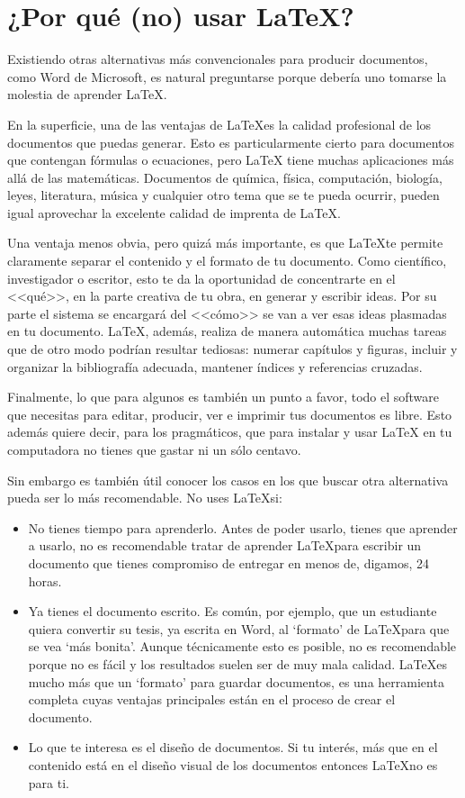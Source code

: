 \documentclass[10pt,a4paper,final,oneside,onecolumn,notitlepage]{article}
\begin{document}
\section{¿Por qu\'e (no) usar \LaTeX?}{
Existiendo otras alternativas más convencionales para producir documentos, como Word de Microsoft, es natural preguntarse porque debería uno tomarse la molestia de aprender LaTeX.

En la superficie, una de las ventajas de \LaTeX es la calidad profesional de los documentos que puedas generar. Esto es particularmente cierto para documentos que contengan fórmulas o ecuaciones, pero LaTeX tiene muchas aplicaciones más allá de las matemáticas. Documentos de química, física, computación, biología, leyes, literatura, música y cualquier otro tema que se te pueda ocurrir, pueden igual aprovechar la excelente calidad de imprenta de LaTeX.

Una ventaja menos obvia, pero quizá más importante, es que \LaTeX te permite claramente separar el contenido y el formato de tu documento. Como científico, investigador o escritor, esto te da la oportunidad de concentrarte en el <<qué>>, en la parte creativa de tu obra, en generar y escribir ideas. Por su parte el sistema se encargará del <<cómo>> se van a ver esas ideas plasmadas en tu documento. LaTeX, además, realiza de manera automática muchas tareas que de otro modo podrían resultar tediosas: numerar capítulos y figuras, incluir y organizar la bibliografía adecuada, mantener índices y referencias cruzadas.

Finalmente, lo que para algunos es también un punto a favor, todo el software que necesitas para editar, producir, ver e imprimir tus documentos es libre. Esto además quiere decir, para los pragmáticos, que para instalar y usar LaTeX en tu computadora no tienes que gastar ni un sólo centavo.

Sin embargo es también útil conocer los casos en los que buscar otra alternativa pueda ser lo más recomendable. No uses \LaTeX si:

\begin{itemize}
\item No tienes tiempo para aprenderlo. Antes de poder usarlo, tienes que aprender a usarlo, no es recomendable tratar de aprender \LaTeX para escribir un documento que tienes compromiso de entregar en menos de, digamos, 24 horas.

\item Ya tienes el documento escrito. Es común, por ejemplo, que un estudiante quiera convertir su tesis, ya escrita en Word, al ‘formato’ de \LaTeX para que se vea ‘más bonita’. Aunque técnicamente esto es posible, no es recomendable porque no es fácil y los resultados suelen ser de muy mala calidad. \LaTeX es mucho más que un ‘formato’ para guardar documentos, es una herramienta completa cuyas ventajas principales están en el proceso de crear el documento.

\item Lo que te interesa es el diseño de documentos. Si tu interés, más que en el contenido está en el diseño visual de los documentos entonces \LaTeX no es para ti.
\end{itemize}
}
\end{document}
